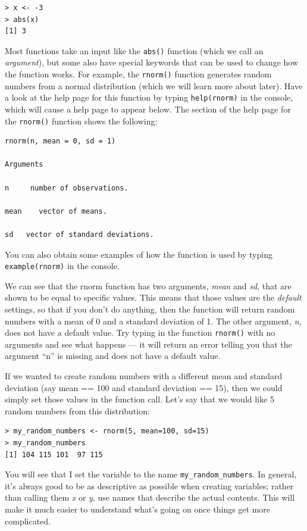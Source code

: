\documentclass[
  12pt,
]{book}
\begin{document}
\begin{verbatim}
> x <- -3
> abs(x)
[1] 3
\end{verbatim}

Most functions take an input like the \texttt{abs()} function (which we call an \emph{argument}), but some also have special keywords that can be used to change how the function works. For example, the \texttt{rnorm()} function generates random numbers from a normal distribution (which we will learn more about later). Have a look at the help page for this function by typing \texttt{help(rnorm)} in the console, which will cause a help page to appear below. The section of the help page for the \texttt{rnorm()} function shows the following:

\begin{verbatim}
rnorm(n, mean = 0, sd = 1)

Arguments

n     number of observations. 

mean    vector of means.

sd   vector of standard deviations.
\end{verbatim}

You can also obtain some examples of how the function is used by typing \texttt{example(rnorm)} in the console.

We can see that the rnorm function has two arguments, \emph{mean} and \emph{sd}, that are shown to be equal to specific values. This means that those values are the \emph{default} settings, so that if you don't do anything, then the function will return random numbers with a mean of 0 and a standard deviation of 1. The other argument, \emph{n}, does not have a default value. Try typing in the function \texttt{rnorm()} with no arguments and see what happens --- it will return an error telling you that the argument ``n'' is missing and does not have a default value.

If we wanted to create random numbers with a different mean and standard deviation (say mean == 100 and standard deviation == 15), then we could simply set those values in the function call. Let's say that we would like 5 random numbers from this distribution:

\begin{verbatim}
> my_random_numbers <- rnorm(5, mean=100, sd=15)
> my_random_numbers
[1] 104 115 101  97 115
\end{verbatim}

You will see that I set the variable to the name \texttt{my\_random\_numbers}. In general, it's always good to be as descriptive as possible when creating variables; rather than calling them \emph{x} or \emph{y}, use names that describe the actual contents. This will make it much easier to understand what's going on once things get more complicated.
\end{document}
